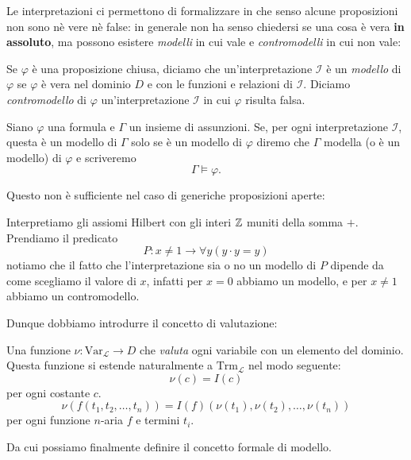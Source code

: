 \documentclass[11pt]{scrartcl}
\begin{document}
	Le interpretazioni ci permettono di formalizzare in che senso alcune proposizioni non sono nè vere nè false: in generale non ha senso chiedersi se una cosa è vera \textbf{in assoluto}, ma possono esistere \textit{modelli} in cui vale e \textit{contromodelli} in cui non vale:
	\begin{definition}
		Se $\varphi$ è una proposizione chiusa, diciamo che un'interpretazione $\mathcal{I}$ è un \textit{modello} di $\varphi$ se $\varphi$ è vera nel dominio $D$ e con le funzioni e relazioni di $\mathcal{I}$. Diciamo \textit{contromodello} di $\varphi$ un'interpretazione $\mathcal{I}$ in cui $\varphi$ risulta falsa. 
	\end{definition}
	\begin{definition}
		Siano $\varphi$ una formula e $\Gamma$ un insieme di assunzioni. Se, per ogni interpretazione $\mathcal{I}$, questa è un modello di $\Gamma$ solo se è un modello di $\varphi$ diremo che $\Gamma$ modella (o è un modello) di $\varphi$ e scriveremo
		$$\Gamma\models \varphi.$$
	\end{definition}
	Questo non è sufficiente nel caso di generiche proposizioni aperte:
	\begin{example}
		Interpretiamo gli assiomi Hilbert con gli interi $\mathbb Z$ muniti della somma $+$. Prendiamo il predicato
		$$P:x\ne 1 \to \forall y \left(y\cdot y=y\right)$$
		notiamo che il fatto che l'interpretazione sia o no  un modello di $P$ dipende da come scegliamo il valore di $x$, infatti per $x=0$ abbiamo un modello, e per $x\ne 1$ abbiamo un contromodello.
	\end{example}
	Dunque dobbiamo introdurre il concetto di valutazione:
	\begin{definition}[Valutazione]
		Una funzione $\nu:\text{Var}_\mathcal{L}\to D$ che \textit{valuta} ogni variabile con un elemento del dominio. Questa funzione si estende naturalmente a $\text{Trm}_\mathcal{L}$ nel modo seguente:
		$$\nu(c)=I(c)$$
		per ogni costante $c$.
		$$\nu\left(f\left(t_1,t_2,\dots,t_n\right)\right)=I(f)\left(\nu(t_1),\nu(t_2),\dots,\nu(t_n)\right)$$ 
		per ogni funzione $n$-aria $f$ e termini $t_i$.
	\end{definition}
	Da cui possiamo finalmente definire il concetto formale di modello.
\end{document}
